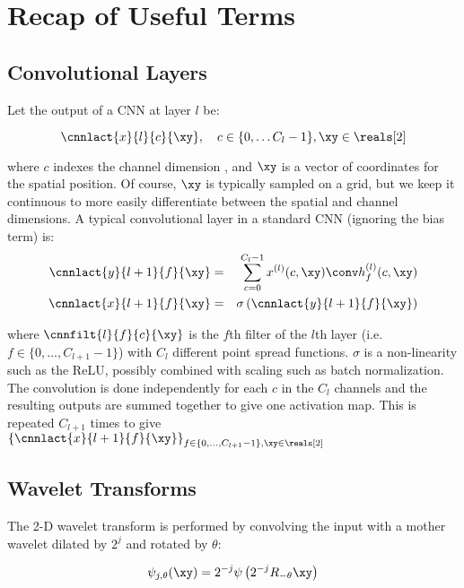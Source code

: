 \section{Recap of Useful Terms}\label{sec:ch5:background}

\subsection{Convolutional Layers}\label{sec:ch5:conv}

Let the output of a CNN at layer $l$ be:

$$ \cnnlact{x}{l}{c}{\xy}, \quad c\in \{0, \ldots C_l-1\}, \xy \in \reals[2]$$

where $c$ indexes the channel dimension , and $\xy$ is a vector of coordinates
for the spatial position. Of course, $\xy$ is typically sampled on a grid, but
we keep it continuous to more easily differentiate between the spatial and
channel dimensions. A typical convolutional layer in a standard CNN (ignoring
the bias term) is:
%
\begin{eqnarray} 
  \cnnlact{y}{l+1}{f}{\xy} &=& \sum_{c=0}^{C_l - 1}  x^{(l)}(c,\xy) \conv h^{(l)}_{f}(c, \xy)
    \label{eq:ch5:conv}\\
    \cnnlact{x}{l+1}{f}{\xy} & = & \sigma \left( \cnnlact{y}{l+1}{f}{\xy} \right) \label{eq:ch5:nonlin}
\end{eqnarray}

where $\cnnfilt{l}{f}{c}{\xy}$ is the $f$th filter of the $l$th layer (i.e. $f \in \{0,
\ldots, C_{l+1}-1 \}$) with $C_l$ different point spread functions. $\sigma$ is a non-linearity 
such as the ReLU, possibly combined with scaling such as batch normalization. The convolution
is done independently for each $c$ in the $C_l$ channels and the resulting outputs are
summed together to give one activation map. This is repeated $C_{l+1}$ times to
give $\left\{ \cnnlact{x}{l+1}{f}{\xy} \right\}_{f \in \{0, \ldots, C_{l+1}-1 \}, \xy \in \reals[2]}$

\subsection{Wavelet Transforms}\label{sec:ch5:wavelets}
The 2-D wavelet transform is performed by convolving the input with a mother wavelet
dilated by $2^j$ and rotated by $\theta$:

\begin{equation}
  \psi_{j, \theta}(\xy) = 2^{-j}\psi \left(2^{-j} R_{-\theta} \xy\right)
\end{equation}

